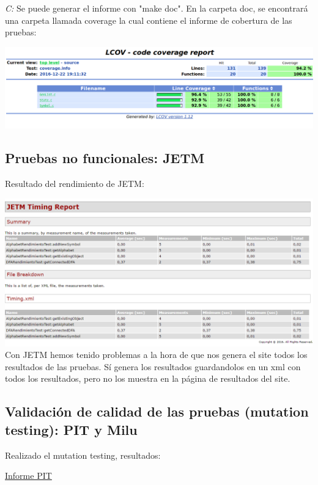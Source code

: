 \documentclass[DIV=calc,paper=a4,fontsize=11pt,onecolumn]{scrartcl} %
\begin{document}
\textit{C:} Se puede generar el informe con "make doc". En la carpeta doc, se encontrará una carpeta llamada coverage la cual contiene el informe de cobertura de las pruebas:

	\includegraphics[width=16cm]{Imagenes/lcov2.png} \\

\subsection{Pruebas no funcionales: JETM}
Resultado del rendimiento de JETM:

	\includegraphics[width=16cm]{Imagenes/JEMReport.png} \\
Con JETM hemos tenido problemas  a la hora de que nos genera el site todos los resultados de las pruebas. Sí genera los resultados guardandolos en un xml con todos los resultados, pero no los muestra en la página de resultados del site.
\subsection{Validación de calidad de las pruebas (mutation testing): PIT y Milu}
Realizado el mutation testing, resultados:

\href{Informes/pit-reports/index.html}{Informe PIT} \\
\end{document}
